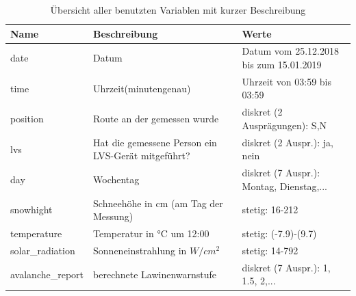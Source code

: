 \documentclass[12pt]{scrreprt}
\begin{document}
	\begin{table}
		
		\centering
		
		\caption{Übersicht aller benutzten Variablen mit kurzer Beschreibung}
		
		\begin{adjustbox}{max width=\textwidth}
			
			\begin{tabular}{l|l|l}
				
				\textbf{Name} & \textbf{Beschreibung} & \textbf{Werte} \\
				
				\hline
				
				\hline
				
				date & Datum & Datum vom 25.12.2018 bis zum 15.01.2019 \\
				
				\hline
				
				time & Uhrzeit(minutengenau) & Uhrzeit von 03:59 bis 03:59 \\
				
				\hline
				
				position & Route an der gemessen wurde & diskret (2 Ausprägungen): S,N \\
				
				\hline
				
				lvs & Hat die gemessene Person ein LVS-Gerät mitgeführt? & diskret (2 Auspr.): ja, nein \\
				
				\hline
				
				day & Wochentag & diskret (7 Auspr.): Montag, Dienstag,... \\
				
				\hline
				
				snowhight & Schneehöhe in cm (am Tag der Messung) & stetig: 16-212 \\
				
				\hline
				
				temperature & Temperatur in °C um 12:00 & stetig: (-7.9)-(9.7) \\
				
				\hline
				
				solar\_radiation & Sonneneinstrahlung in $W/cm^2$ & stetig: 14-792 \\
				
				\hline
				
				avalanche\_report & berechnete Lawinenwarnstufe & diskret (7 Auspr.): 1, 1.5, 2,... \\
				

\end{tabular}
\end{adjustbox}
\end{table}
\end{document}
